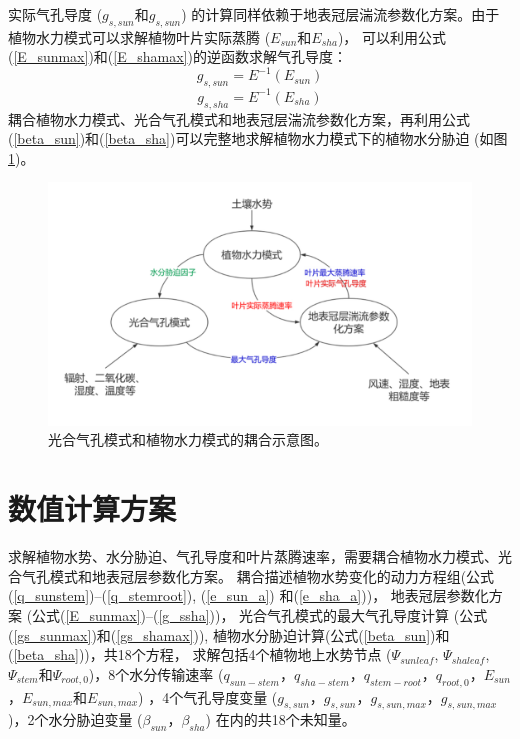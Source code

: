 实际气孔导度 ($g_{s,sun}$和$g_{s,sun}$) 的计算同样依赖于地表冠层湍流参数化方案。由于植物水力模式可以求解植物叶片实际蒸腾 ($E_{sun}$和$E_{sha}$)，
可以利用公式(\ref{E_sunmax})和(\ref{E_shamax})的逆函数求解气孔导度：
\begin{equation}\label{g_ssun}
g_{s, s u n}=E^{-1}\left(E_{s u n}\right)
\end{equation}
\begin{equation}\label{g_ssha}
g_{s, sha}=E^{-1}\left(E_{s h a}\right)
\end{equation}
耦合植物水力模式、光合气孔模式和地表冠层湍流参数化方案，再利用公式(\ref{beta_sun})和(\ref{beta_sha})可以完整地求解植物水力模式下的植物水分胁迫 (如图 \ref{fig:光合气孔模式和植物水力模式的耦合示意图})。
{
    \begin{figure}[]
    \centering
    \includegraphics{Figures/植被水力模式/光合气孔模式和植物水力模式的耦合示意图.png}
    \caption{光合气孔模式和植物水力模式的耦合示意图。}
    \label{fig:光合气孔模式和植物水力模式的耦合示意图}
    \end{figure}
    }
    
\section{数值计算方案}\label{数值计算方案}
求解植物水势、水分胁迫、气孔导度和叶片蒸腾速率，需要耦合植物水力模式、光合气孔模式和地表冠层参数化方案。
耦合描述植物水势变化的动力方程组(公式(\ref{q_sunstem})--(\ref{q_stemroot}), (\ref{e_sun_a}) 和(\ref{e_sha_a}))，
地表冠层参数化方案 (公式(\ref{E_sunmax})--(\ref{g_ssha}))，
光合气孔模式的最大气孔导度计算 (公式(\ref{gs_sunmax})和(\ref{gs_shamax})), 植物水分胁迫计算(公式(\ref{beta_sun})和(\ref{beta_sha}))，共18个方程，
求解包括4个植物地上水势节点 ($\Psi_{sunleaf}$, $\Psi_{shaleaf}$, $\Psi_{stem}$和$\Psi_{root,0}$)，8个水分传输速率 
($q_{sun-stem}$，$q_{sha-stem}$，$q_{stem-root}$，$q_{root,0}$，$E_{sun}$，$E_{sun,max}$和$E_{sun,max}$) ，4个气孔导度变量
 ($g_{s,sun}$，$g_{s,sun}$，$g_{s,sun,max}$，$g_{s,sun,max}$)，2个水分胁迫变量 ($\beta_{sun}$，$\beta_{sha}$) 在内的共18个未知量。

